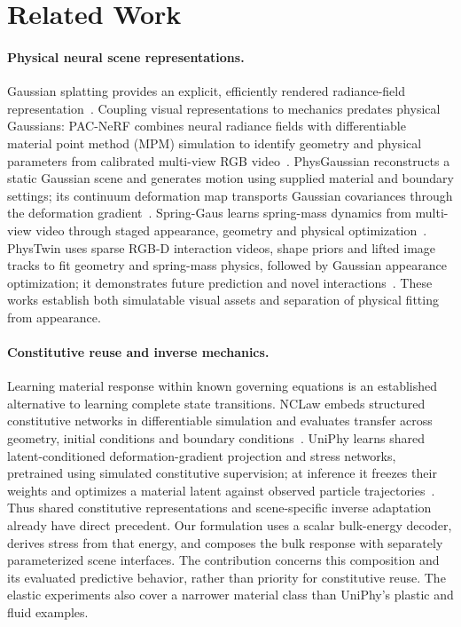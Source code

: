 \section{Related Work}
\label{sec:related}

\paragraph{Physical neural scene representations.}
Gaussian splatting provides an explicit, efficiently rendered radiance-field
representation~\cite{kerbl2023gaussians}. Coupling visual representations to
mechanics predates physical Gaussians: PAC-NeRF combines neural radiance fields
with differentiable material point method (MPM) simulation to identify geometry
and physical parameters from calibrated multi-view RGB
video~\cite{li2023pacnerf}. PhysGaussian reconstructs a static Gaussian scene and
generates motion using supplied material and boundary settings; its continuum
deformation map transports Gaussian covariances through the deformation
gradient~\cite{xie2024physgaussian}. Spring-Gaus learns spring-mass dynamics from
multi-view video through staged appearance, geometry and physical
optimization~\cite{zhong2024springgaus}. PhysTwin uses sparse RGB-D interaction
videos, shape priors and lifted image tracks to fit geometry and spring-mass
physics, followed by Gaussian appearance optimization; it demonstrates future
prediction and novel interactions~\cite{jiang2025phystwin}. These works establish
both simulatable visual assets and separation of physical fitting from appearance.

\paragraph{Constitutive reuse and inverse mechanics.}
Learning material response within known governing equations is an established
alternative to learning complete state transitions. NCLaw embeds structured
constitutive networks in differentiable simulation and evaluates transfer across
geometry, initial conditions and boundary conditions~\cite{ma2023nclaw}.
UniPhy learns shared latent-conditioned deformation-gradient projection and
stress networks, pretrained using simulated constitutive supervision; at
inference it freezes their weights and optimizes a material latent against
observed particle trajectories~\cite{mittal2025uniphy}. Thus shared constitutive
representations and scene-specific inverse adaptation already have direct
precedent. Our formulation uses a scalar bulk-energy decoder, derives stress
from that energy, and composes the bulk response with separately parameterized
scene interfaces. The contribution concerns this composition and its evaluated
predictive behavior, rather than priority for constitutive reuse. The elastic
experiments also cover a narrower material class than UniPhy's plastic and
fluid examples.

